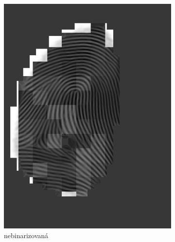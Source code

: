  \begin{figure}[h]
    \centering
    \begin{subfigure}[b]{0.3\linewidth}
      \includegraphics[width=\linewidth]{obrazky-figures/gabor_filtered.png}
      \caption{nebinarizovaná}
    \end{subfigure}
    \hspace{0.05\linewidth}
    \begin{subfigure}[b]{0.3\linewidth}

\end{subfigure}
\end{figure}
